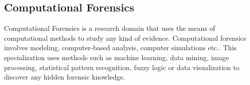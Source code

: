 \subsection{Computational Forensics} Computational Forensics is a research domain that uses the means of computational methods to study any kind of evidence. Computational forensics involves modeling, computer-based \nohyphens{analysis,} computer simulations etc.. This specialization uses methods such as machine learning, data mining, image processing, statistical pattern recognition, fuzzy logic or data visualization to discover any hidden forensic knowledge. 

%
%
%
%
%
%
%
%
%
%
%
%		
%
%
%
%
%
%



